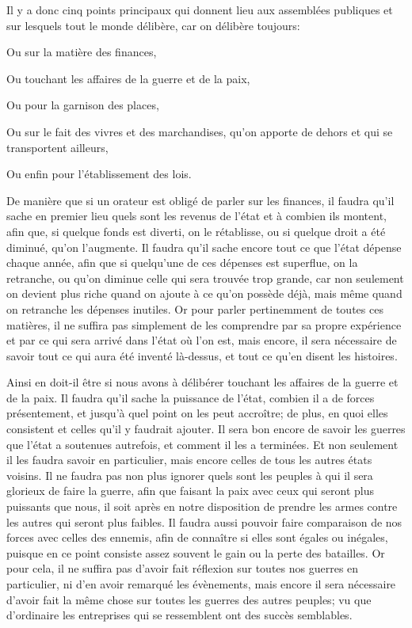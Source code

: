 \bigbreak

Il y a donc cinq points principaux qui donnent lieu aux assemblées publiques et sur lesquels tout le monde délibère, car
on délibère toujours:

\begin{emphpar}
     Ou sur la matière des finances,

     Ou touchant les affaires de la guerre et de la paix, 

     Ou pour la garnison des places, 

     Ou sur le fait des vivres et des marchandises, qu'on apporte de dehors et qui se transportent ailleurs,

     Ou enfin pour l'établissement des lois.
\end{emphpar}

De manière que si un orateur est obligé de parler sur les finances, il faudra qu'il sache en premier lieu quels sont les
revenus de l'état et à combien ils montent, afin que, si quelque fonds est diverti, on le rétablisse, ou si quelque droit a
été diminué, qu'on l'augmente. Il faudra qu'il sache encore tout ce que l'état dépense chaque année, afin que si quelqu'une
de ces dépenses est superflue, on la retranche, ou qu'on diminue celle qui sera trouvée trop grande, car non seulement on
devient plus riche quand on ajoute à ce qu'on possède déjà, mais même quand on retranche les dépenses inutiles. Or pour parler
pertinemment de toutes ces matières, il ne suffira pas simplement de les comprendre par sa propre expérience et par ce qui
sera arrivé dans l'état où l'on est, mais encore, il sera nécessaire de savoir tout ce qui aura été inventé là-dessus, et tout
ce qu'en disent les histoires.

Ainsi en doit-il être si nous avons à délibérer touchant les affaires de la guerre et de la paix. Il faudra qu'il sache la
puissance de l'état, combien il a de forces présentement, et jusqu'à quel point on les peut accroître; de plus, en quoi elles
consistent et celles qu'il y faudrait ajouter. Il sera bon encore de savoir les guerres que l'état a soutenues autrefois, et
comment il les a terminées. Et non seulement il les faudra savoir en particulier, mais encore celles de tous les autres états
voisins. Il ne faudra pas non plus ignorer quels sont les peuples à qui il sera glorieux de faire la guerre, afin que faisant
la paix avec ceux qui seront plus puissants que nous, il soit après en notre disposition de prendre les armes contre les autres
qui seront plus faibles. Il faudra aussi pouvoir faire comparaison de nos forces avec celles des ennemis, afin de connaître si
elles sont égales ou inégales, puisque en ce point consiste assez souvent le gain ou la perte des batailles. Or pour cela, il ne
suffira pas d'avoir fait réflexion sur toutes nos guerres en particulier, ni d'en avoir remarqué les évènements, mais encore il
sera nécessaire d'avoir fait la même chose sur toutes les guerres des autres peuples; vu que d'ordinaire les entreprises qui se
ressemblent ont des succès semblables.

